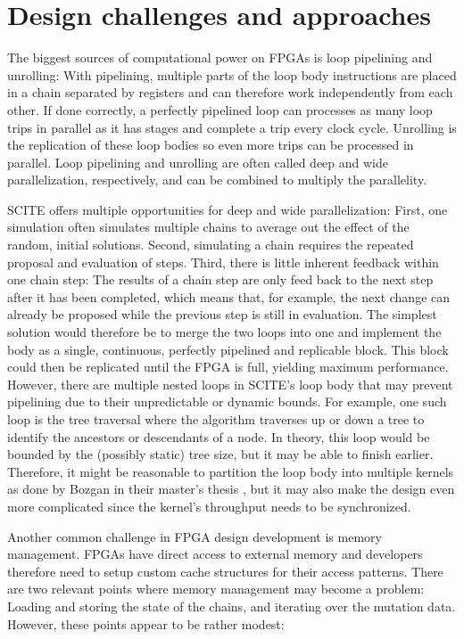 \section{Design challenges and approaches}

The biggest sources of computational power on \acp{FPGA} is loop pipelining and unrolling: With pipelining, multiple parts of the loop body instructions are placed in a chain separated by registers and can therefore work independently from each other. If done correctly, a perfectly pipelined loop can processes as many loop trips in parallel as it has stages and complete a trip every clock cycle. Unrolling is the replication of these loop bodies so even more trips can be processed in parallel. Loop pipelining and unrolling are often called deep and wide parallelization, respectively, and can be combined to multiply the parallelity.

\ac{SCITE} offers multiple opportunities for deep and wide parallelization: First, one simulation often simulates multiple chains to average out the effect of the random, initial solutions. Second, simulating a chain requires the repeated proposal and evaluation of steps. Third, there is little inherent feedback within one chain step: The results of a chain step are only feed back to the next step after it has been completed, which means that, for example, the next change can already be proposed while the previous step is still in evaluation. The simplest solution would therefore be to merge the two loops into one and implement the body as a single, continuous, perfectly pipelined and replicable block. This block could then be replicated until the \ac{FPGA} is full, yielding maximum performance. However, there are multiple nested loops in \ac{SCITE}'s loop body that may prevent pipelining due to their unpredictable or dynamic bounds. For example, one such loop is the tree traversal where the algorithm traverses up or down a tree to identify the ancestors or descendants of a node. In theory, this loop would be bounded by the (possibly static) tree size, but it may be able to finish earlier. Therefore, it might be reasonable to partition the loop body into multiple kernels as done by Bozgan in their master's thesis \cite{bozgan_2019}, but it may also make the design even more complicated since the kernel's throughput needs to be synchronized.

Another common challenge in \ac{FPGA} design development is memory management. \acp{FPGA} have direct access to external memory and developers therefore need to setup custom cache structures for their access patterns. There are two relevant points where memory management may become a problem: Loading and storing the state of the chains, and iterating over the mutation data. However, these points appear to be rather modest:

